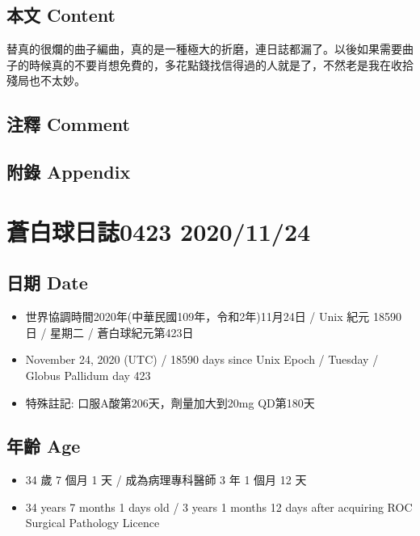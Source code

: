 \documentclass[a5paper, 11pt
]{book}
\providecommand{\tightlist}{%
  \setlength{\itemsep}{0pt}\setlength{\parskip}{0pt}}
\begin{document}
\hypertarget{ux672cux6587-content-74}{%
\subsection{本文 Content}\label{ux672cux6587-content-74}}

替真的很爛的曲子編曲，真的是一種極大的折磨，連日誌都漏了。以後如果需要曲子的時候真的不要肖想免費的，多花點錢找信得過的人就是了，不然老是我在收拾殘局也不太妙。

\hypertarget{ux6ce8ux91cb-comment-74}{%
\subsection{注釋 Comment}\label{ux6ce8ux91cb-comment-74}}

\hypertarget{ux9644ux9304-appendix-74}{%
\subsection{附錄 Appendix}\label{ux9644ux9304-appendix-74}}

\hypertarget{ux84bcux767dux7403ux65e5ux8a8c0423-20201124}{%
\section{蒼白球日誌0423
2020/11/24}\label{ux84bcux767dux7403ux65e5ux8a8c0423-20201124}}

\hypertarget{ux65e5ux671f-date-75}{%
\subsection{日期 Date}\label{ux65e5ux671f-date-75}}

\begin{itemize}
\tightlist
\item
  世界協調時間2020年(中華民國109年，令和2年)11月24日 / Unix 紀元 18590
  日 / 星期二 / 蒼白球紀元第423日
\item
  November 24, 2020 (UTC) / 18590 days since Unix Epoch / Tuesday /
  Globus Pallidum day 423
\item
  特殊註記: 口服A酸第206天，劑量加大到20mg QD第180天
\end{itemize}

\hypertarget{ux5e74ux9f61-age-75}{%
\subsection{年齡 Age}\label{ux5e74ux9f61-age-75}}

\begin{itemize}
\tightlist
\item
  34 歲 7 個月 1 天 / 成為病理專科醫師 3 年 1 個月 12 天
\item
  34 years 7 months 1 days old / 3 years 1 months 12 days after
  acquiring ROC Surgical Pathology Licence
\end{itemize}
\end{document}
